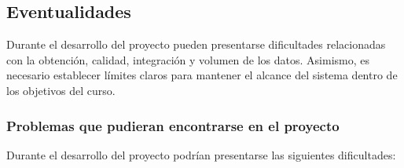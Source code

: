\documentclass[12pt,a4paper]{article}
\begin{document}
\subsection{Eventualidades}

Durante el desarrollo del proyecto pueden presentarse dificultades relacionadas con la obtención, calidad, integración y volumen de los datos. Asimismo, es necesario establecer límites claros para mantener el alcance del sistema dentro de los objetivos del curso.

\subsubsection{Problemas que pudieran encontrarse en el proyecto}

Durante el desarrollo del proyecto podrían presentarse las siguientes dificultades:
\end{document}
